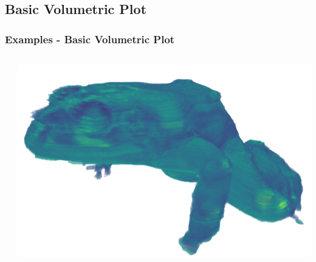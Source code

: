 \documentclass[t]{beamer}
\begin{document}
\subsection{Basic Volumetric Plot}
\begin{frame}
  \frametitle{Examples - Basic Volumetric Plot}

  \begin{center}
    \begin{columns}[T]
      \begin{column}{.5\textwidth}
        \inputminted[fontsize=\footnotesize]{python}{code/basic_usage2.py}
      \end{column}

      \begin{column}{.5\textwidth}
        \centering
        \includegraphics[width=1.0\textwidth]{figures/basic_usage2.png}
      \end{column}
    \end{columns}
  \end{center}

\end{frame}

\end{document}
